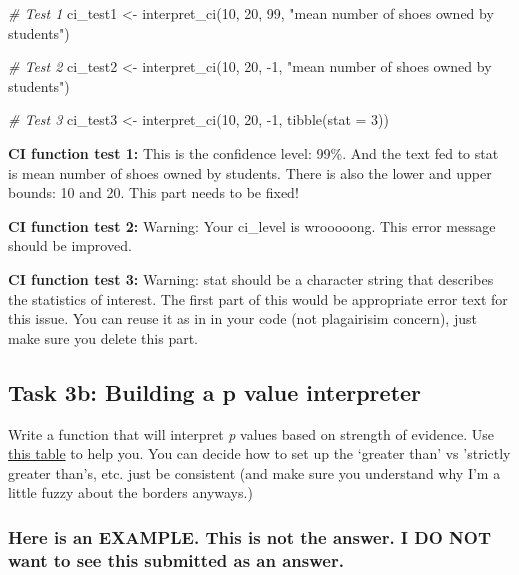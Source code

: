 \documentclass[
  openany]{book}
\newenvironment{Shaded}{\begin{snugshade}}{\end{snugshade}}
\newcommand{\AttributeTok}[1]{\textcolor[rgb]{0.77,0.63,0.00}{#1}}
\newcommand{\CommentTok}[1]{\textcolor[rgb]{0.56,0.35,0.01}{\textit{#1}}}
\newcommand{\DecValTok}[1]{\textcolor[rgb]{0.00,0.00,0.81}{#1}}
\newcommand{\FunctionTok}[1]{\textcolor[rgb]{0.00,0.00,0.00}{#1}}
\newcommand{\NormalTok}[1]{#1}
\newcommand{\OtherTok}[1]{\textcolor[rgb]{0.56,0.35,0.01}{#1}}
\newcommand{\SpecialCharTok}[1]{\textcolor[rgb]{0.00,0.00,0.00}{#1}}
\newcommand{\StringTok}[1]{\textcolor[rgb]{0.31,0.60,0.02}{#1}}
\begin{document}
\begin{Shaded}
\begin{Highlighting}[]
\CommentTok{\# Test 1}
\NormalTok{ci\_test1 }\OtherTok{\textless{}{-}} \FunctionTok{interpret\_ci}\NormalTok{(}\DecValTok{10}\NormalTok{, }\DecValTok{20}\NormalTok{, }\DecValTok{99}\NormalTok{, }\StringTok{"mean number of shoes owned by students"}\NormalTok{)}

\CommentTok{\# Test 2}
\NormalTok{ci\_test2 }\OtherTok{\textless{}{-}} \FunctionTok{interpret\_ci}\NormalTok{(}\DecValTok{10}\NormalTok{, }\DecValTok{20}\NormalTok{, }\SpecialCharTok{{-}}\DecValTok{1}\NormalTok{, }\StringTok{"mean number of shoes owned by students"}\NormalTok{)}

\CommentTok{\# Test 3}
\NormalTok{ci\_test3 }\OtherTok{\textless{}{-}} \FunctionTok{interpret\_ci}\NormalTok{(}\DecValTok{10}\NormalTok{, }\DecValTok{20}\NormalTok{, }\SpecialCharTok{{-}}\DecValTok{1}\NormalTok{, }\FunctionTok{tibble}\NormalTok{(}\AttributeTok{stat =} \DecValTok{3}\NormalTok{))}
\end{Highlighting}
\end{Shaded}

\textbf{CI function test 1:} This is the confidence level: 99\%. And the text fed to stat is mean number of shoes owned by students. There is also the lower and upper bounds: 10 and 20. This part needs to be fixed!

\textbf{CI function test 2:}
Warning: Your ci\_level is wrooooong.
This error message should be improved.

\textbf{CI function test 3:}
Warning:
stat should be a character string that describes the statistics of
interest. The first part of this would be appropriate error text for this
issue. You can reuse it as in in your code (not plagairisim concern),
just make sure you delete this part.

\hypertarget{task-3b-building-a-p-value-interpreter}{%
\subsection{Task 3b: Building a p value interpreter}\label{task-3b-building-a-p-value-interpreter}}

Write a function that will interpret \emph{p} values based on strength of evidence. Use \protect\hyperlink{p-values-recap}{this table} to help you. You can decide how to set up the `greater than' vs 'strictly greater than's, etc. just be consistent (and make sure you understand why I'm a little fuzzy about the borders anyways.)

\hypertarget{here-is-an-example.-this-is-not-the-answer.-i-do-not-want-to-see-this-submitted-as-an-answer.}{%
\subsubsection{Here is an EXAMPLE. This is not the answer. I DO NOT want to see this submitted as an answer.}\label{here-is-an-example.-this-is-not-the-answer.-i-do-not-want-to-see-this-submitted-as-an-answer.}}
\end{document}
